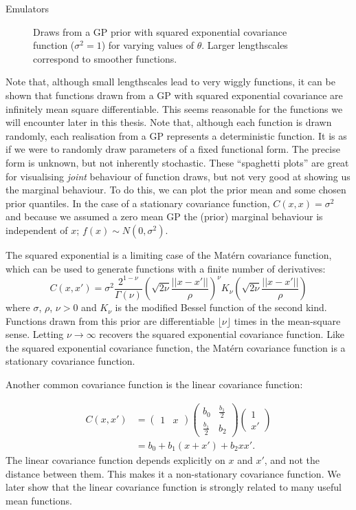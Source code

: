 \begin{chapter}{Emulators \label{Ch:Emulators}}
\begin{figure}[h]
  \caption{Draws from a GP prior with squared exponential covariance function ($\sigma^2 = 1$) for varying values of $\theta$. Larger lengthscales correspond to smoother functions.}
  \label{Fig:random-funcs}
\end{figure}
Note that, although small lengthscales lead to very wiggly functions, it can be shown that functions drawn from a GP with squared exponential covariance are infinitely mean square differentiable. This seems reasonable for the functions we will encounter later in this thesis. Note that, although each function is drawn randomly, each realisation from a GP represents a deterministic function. It is as if we were to randomly draw parameters of a fixed functional form. The precise form is unknown, but not inherently stochastic. These ``spaghetti plots'' are great for visualising \textit{joint} behaviour of function draws, but not very good at showing us the marginal behaviour. To do this, we can plot the prior mean and some chosen prior quantiles. In the case of a stationary covariance function, $C(x, x) = \sigma^2$ and because we assumed a zero mean GP the (prior) marginal behaviour is independent of $x$; $f(x) \sim  N(0, \sigma^2)$.

The squared exponential is a limiting case of the Mat\'ern covariance function, which can be used to generate functions with a finite number of derivatives:
\begin{equation}
  C(x, x') = \sigma^2 \frac{2^{1-\nu}}{\Gamma(\nu)} \left( \sqrt{2\nu}\frac{||x - x'||}{\rho} \right)^\nu K_\nu\left(\sqrt{2\nu}\frac{||x - x'||}{\rho} \right)
\end{equation}
where $\sigma$, $\rho$, $\nu > 0$ and $K_\nu$ is the modified Bessel function of the second kind. Functions drawn from this prior are differentiable $\lfloor \nu \rfloor$ times in the mean-square sense. Letting $\nu \to \infty$ recovers the squared exponential covariance function. Like the squared exponential covariance function, the Mat\'ern covariance function is a stationary covariance function.

Another common covariance function is the linear covariance function:

\begin{align}
  C(x, x') &= \begin{pmatrix}
    1&x
\end{pmatrix}
\begin{pmatrix}
  b_0 & \frac{b_1}{2} \\ \frac{b_1}{2} & b_2
\end{pmatrix}
\begin{pmatrix}
  1 \\ x'
\end{pmatrix} \\ \nonumber
  &= b_{0} + b_{1}(x + x') + b_2 x x'.
\end{align}
The linear covariance function depends explicitly on $x$ and $x'$, and not the distance between them. This makes it a non-stationary covariance function. We later show that the linear covariance function is strongly related to many useful mean functions.


\end{chapter}

